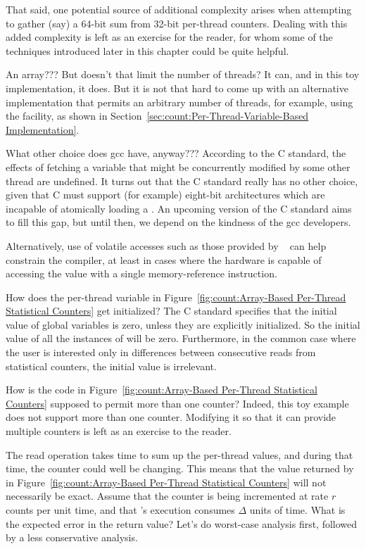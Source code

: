 	That said, one potential source of additional complexity arises
	when attempting to gather (say) a 64-bit sum from 32-bit
	per-thread counters.
	Dealing with this added complexity is left as
	an exercise for the reader, for whom some of the techniques
	introduced later in this chapter could be quite helpful.

\QuickQ{}
	An array???
	But doesn't that limit the number of threads?
\QuickA{}
	It can, and in this toy implementation, it does.
	But it is not that hard to come up with an alternative
	implementation that permits an arbitrary number of threads,
	for example, using the   facility,
	as shown in
	Section~\ref{sec:count:Per-Thread-Variable-Based Implementation}.

\QuickQ{}
	What other choice does gcc have, anyway???
\QuickA{}
	According to the C standard, the effects of fetching a variable
	that might be concurrently modified by some other thread are
	undefined.
	It turns out that the C standard really has no other choice,
	given that C must support (for example) eight-bit architectures
	which are incapable of atomically loading a .
	An upcoming version of the C standard aims to fill this gap,
	but until then, we depend on the kindness of the gcc developers.

	Alternatively, use of volatile accesses such as those provided
	by ~\cite{JonCorbet2012ACCESS:ONCE}
	can help constrain the compiler, at least
	in cases where the hardware is capable of accessing the value
	with a single memory-reference instruction.

\QuickQ{}
	How does the per-thread  variable in
	Figure~\ref{fig:count:Array-Based Per-Thread Statistical Counters}
	get initialized?
\QuickA{}
	The C standard specifies that the initial value of
	global variables is zero, unless they are explicitly initialized.
	So the initial value of all the instances of 
	will be zero.
	Furthermore, in the common case where the user is interested only
	in differences between consecutive reads
	from statistical counters, the initial value is irrelevant.

\QuickQ{}
	How is the code in
	Figure~\ref{fig:count:Array-Based Per-Thread Statistical Counters}
	supposed to permit more than one counter?
\QuickA{}
	Indeed, this toy example does not support more than one counter.
	Modifying it so that it can provide multiple counters is left
	as an exercise to the reader.

\QuickQ{}
	The read operation takes time to sum up the per-thread values,
	and during that time, the counter could well be changing.
	This means that the value returned by
	 in
	Figure~\ref{fig:count:Array-Based Per-Thread Statistical Counters}
	will not necessarily be exact.
	Assume that the counter is being incremented at rate
	$r$ counts per unit time, and that 's
	execution consumes $\Delta$ units of time.
	What is the expected error in the return value?
\QuickA{}
	Let's do worst-case analysis first, followed by a less
	conservative analysis.


